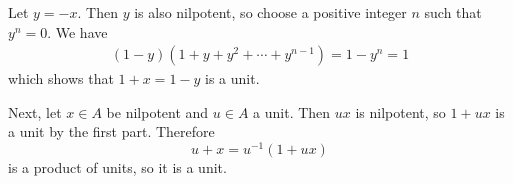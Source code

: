 \documentclass{homework}
\begin{document}
\begin{solution}
Let $y = -x$.
Then $y$ is also nilpotent, so choose a positive integer $n$ such that
$y^n = 0$.
We have
\begin{align*}
(1 - y) (1 + y + y^2 + \cdots + y^{n-1})
= 1 - y^n
= 1
\end{align*}
which shows that $1 + x = 1 - y$ is a unit.

Next, let $x\in A$ be nilpotent and $u\in A$ a unit.
Then $ux$ is nilpotent, so $1 + ux$ is a unit by the first part.
Therefore
\begin{equation*}
u + x = u^{-1}(1 + ux)
\end{equation*}
is a product of units, so it is a unit.
\end{solution}
\end{document}
